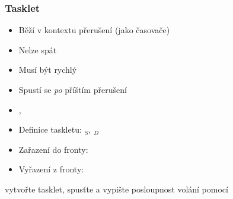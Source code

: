 \begin{frame}
  \frametitle{Tasklet}

  \begin{itemize}
    \item Běží v kontextu přerušení (jako časovače)
    \item Nelze spát
    \item Musí být rychlý
    \item Spustí se \emph{po} příštím přerušení
  \end{itemize}

  \pause
  \smallskip

  \begin{itemize}
    \item {}, 
    \item Definice taskletu: $_S$,
      $_D$

    \pause

    \item Zařazení do fronty: 
    \item Vyřazení z fronty: 
  \end{itemize}

  \iffimuni
  \pause
  \bigskip

   vytvořte tasklet, spusťte a vypište posloupnost volání pomocí
  \fi

\end{frame}


